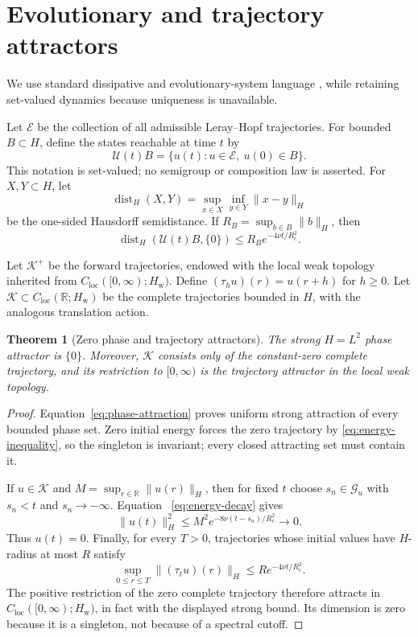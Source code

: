 \documentclass[12pt]{article}
\newtheorem{theorem}{Theorem}[section]
\theoremstyle{definition}
\theoremstyle{remark}
\newcommand{\dist}{\operatorname{dist}}
\begin{document}
\section{Evolutionary and trajectory attractors}\label{sec:attractors}

We use standard dissipative and evolutionary-system language
\cite{Temam1997,CheskidovFoias2006}, while retaining set-valued dynamics
because uniqueness is unavailable.

Let $\mathcal E$ be the collection of all admissible Leray--Hopf
trajectories.  For bounded $B\subset H$, define the states reachable at time
$t$ by
\[
 \mathcal U(t)B=\{u(t):u\in\mathcal E,\ u(0)\in B\}.
\]
This notation is set-valued; no semigroup or composition law is asserted.
For $X,Y\subset H$, let
\[
 \dist_H(X,Y)=\sup_{x\in X}\inf_{y\in Y}\|x-y\|_H
\]
be the one-sided Hausdorff semidistance.  If
$R_B=\sup_{b\in B}\|b\|_H$, then
\begin{equation}\label{eq:phase-attraction}
 \dist_H(\mathcal U(t)B,\{0\})
 \le R_Be^{-4\nu t/R_c^2}.
\end{equation}

Let $\mathcal K^+$ be the forward trajectories, endowed with the local weak
topology inherited from $C_{\mathrm{loc}}([0,\infty);H_{\mathrm w})$.
Define $(\tau_hu)(r)=u(r+h)$ for $h\ge0$.  Let
$\mathcal K\subset C_{\mathrm{loc}}(\mathbb R;H_{\mathrm w})$ be the complete
trajectories bounded in $H$, with the analogous translation action.

\begin{theorem}[Zero phase and trajectory attractors]\label{thm:attractor}
The strong $H=L^2$ phase attractor is $\{0\}$.  Moreover, $\mathcal K$
consists only of the constant-zero complete trajectory, and its restriction
to $[0,\infty)$ is the trajectory attractor in the local weak topology.
\end{theorem}

\begin{proof}
Equation~\eqref{eq:phase-attraction} proves uniform strong attraction of every
bounded phase set.  Zero initial energy forces the zero trajectory by
\eqref{eq:energy-inequality}, so the singleton is invariant; every closed
attracting set must contain it.

If $u\in\mathcal K$ and
$M=\sup_{r\in\mathbb R}\|u(r)\|_H$, then for fixed $t$ choose
$s_n\in\mathcal G_u$ with $s_n<t$ and $s_n\to-\infty$.  Equation
~\eqref{eq:energy-decay} gives
\[
 \|u(t)\|_H^2\le M^2e^{-8\nu(t-s_n)/R_c^2}\longrightarrow0.
\]
Thus $u(t)=0$.  Finally, for every $T>0$, trajectories whose initial values
have $H$-radius at most $R$ satisfy
\[
 \sup_{0\le r\le T}\|(\tau_tu)(r)\|_H
 \le Re^{-4\nu t/R_c^2}.
\]
The positive restriction of the zero complete trajectory therefore attracts
in $C_{\mathrm{loc}}([0,\infty);H_{\mathrm w})$, in fact with the displayed
strong bound.  Its dimension is zero because it is a singleton, not because
of a spectral cutoff.
\end{proof}
\end{document}
